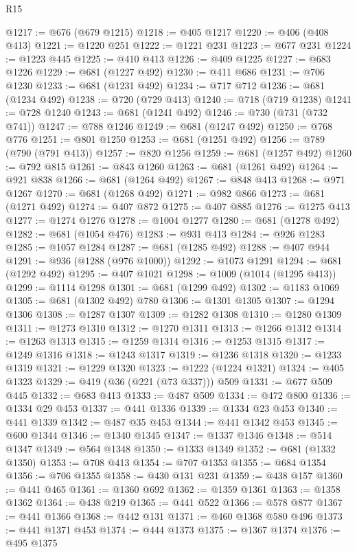 \begin{lexlean}{R15}
\begin{coremodule}
@1217 := @676 (@679 @1215)
@1218 := @405 @1217
@1220 := @406 (@408 @413)
@1221 := @1220 @251
@1222 := @1221 @231
@1223 := @677 @231
@1224 := @1223 @445
@1225 := @410 @413
@1226 := @409 @1225
@1227 := @683 @1226
@1229 := @681 (@1227 @492)
@1230 := @411 @686
@1231 := @706 @1230
@1233 := @681 (@1231 @492)
@1234 := @717 @712
@1236 := @681 (@1234 @492)
@1238 := @720 (@729 @413)
@1240 := @718 (@719 @1238)
@1241 := @728 @1240
@1243 := @681 (@1241 @492)
@1246 := @730 (@731 (@732 @741))
@1247 := @788 @1246
@1249 := @681 (@1247 @492)
@1250 := @768 @776
@1251 := @801 @1250
@1253 := @681 (@1251 @492)
@1256 := @789 (@790 (@791 @413))
@1257 := @820 @1256
@1259 := @681 (@1257 @492)
@1260 := @792 @815
@1261 := @843 @1260
@1263 := @681 (@1261 @492)
@1264 := @921 @838
@1266 := @681 (@1264 @492)
@1267 := @848 @413
@1268 := @971 @1267
@1270 := @681 (@1268 @492)
@1271 := @982 @866
@1273 := @681 (@1271 @492)
@1274 := @407 @872
@1275 := @407 @885
@1276 := @1275 @413
@1277 := @1274 @1276
@1278 := @1004 @1277
@1280 := @681 (@1278 @492)
@1282 := @681 (@1054 @476)
@1283 := @931 @413
@1284 := @926 @1283
@1285 := @1057 @1284
@1287 := @681 (@1285 @492)
@1288 := @407 @944
@1291 := @936 (@1288 (@976 @1000))
@1292 := @1073 @1291
@1294 := @681 (@1292 @492)
@1295 := @407 @1021
@1298 := @1009 (@1014 (@1295 @413))
@1299 := @1114 @1298
@1301 := @681 (@1299 @492)
@1302 := @1183 @1069
@1305 := @681 (@1302 @492) @780
@1306 := @1301 @1305
@1307 := @1294 @1306
@1308 := @1287 @1307
@1309 := @1282 @1308
@1310 := @1280 @1309
@1311 := @1273 @1310
@1312 := @1270 @1311
@1313 := @1266 @1312
@1314 := @1263 @1313
@1315 := @1259 @1314
@1316 := @1253 @1315
@1317 := @1249 @1316
@1318 := @1243 @1317
@1319 := @1236 @1318
@1320 := @1233 @1319
@1321 := @1229 @1320
@1323 := @1222 (@1224 @1321)
@1324 := @405 @1323
@1329 := @419 (@36 (@221 (@73 @337))) @509
@1331 := @677 @509 @445
@1332 := @683 @413
@1333 := @487 @509
@1334 := @472 @800
@1336 := @1334 @29 @453
@1337 := @441 @1336
@1339 := @1334 @23 @453
@1340 := @441 @1339
@1342 := @487 @35 @453
@1344 := @441 @1342 @453
@1345 := @600 @1344
@1346 := @1340 @1345
@1347 := @1337 @1346
@1348 := @514 @1347
@1349 := @564 @1348
@1350 := @1333 @1349
@1352 := @681 (@1332 @1350)
@1353 := @708 @413
@1354 := @707 @1353
@1355 := @684 @1354
@1356 := @706 @1355
@1358 := @430 @131 @231
@1359 := @438 @157
@1360 := @441 @465
@1361 := @1360 @692
@1362 := @1359 @1361
@1363 := @1358 @1362
@1364 := @438 @219
@1365 := @441 @522
@1366 := @578 @877
@1367 := @441 @1366
@1368 := @442 @131
@1371 := @460 @1368 @580 @496
@1373 := @441 @1371 @453
@1374 := @444 @1373
@1375 := @1367 @1374
@1376 := @495 @1375

\end{coremodule}
\end{lexlean}

